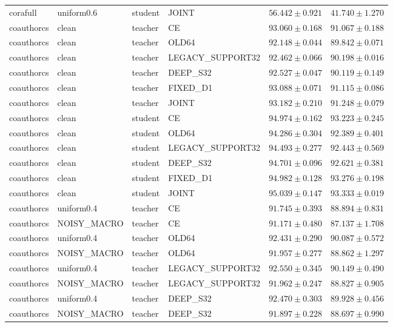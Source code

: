 \begin{longtable}{llllrr}
corafull & uniform0.6 & student & JOINT & $56.442 \pm 0.921$ & $41.740 \pm 1.270$ \\
coauthorcs & clean & teacher & CE & $93.060 \pm 0.168$ & $91.067 \pm 0.188$ \\
coauthorcs & clean & teacher & OLD64 & $92.148 \pm 0.044$ & $89.842 \pm 0.071$ \\
coauthorcs & clean & teacher & LEGACY\_SUPPORT32 & $92.462 \pm 0.066$ & $90.198 \pm 0.016$ \\
coauthorcs & clean & teacher & DEEP\_S32 & $92.527 \pm 0.047$ & $90.119 \pm 0.149$ \\
coauthorcs & clean & teacher & FIXED\_D1 & $93.088 \pm 0.071$ & $91.115 \pm 0.086$ \\
coauthorcs & clean & teacher & JOINT & $93.182 \pm 0.210$ & $91.248 \pm 0.079$ \\
coauthorcs & clean & student & CE & $94.974 \pm 0.162$ & $93.223 \pm 0.245$ \\
coauthorcs & clean & student & OLD64 & $94.286 \pm 0.304$ & $92.389 \pm 0.401$ \\
coauthorcs & clean & student & LEGACY\_SUPPORT32 & $94.493 \pm 0.277$ & $92.443 \pm 0.569$ \\
coauthorcs & clean & student & DEEP\_S32 & $94.701 \pm 0.096$ & $92.621 \pm 0.381$ \\
coauthorcs & clean & student & FIXED\_D1 & $94.982 \pm 0.128$ & $93.276 \pm 0.198$ \\
coauthorcs & clean & student & JOINT & $95.039 \pm 0.147$ & $93.333 \pm 0.019$ \\
coauthorcs & uniform0.4 & teacher & CE & $91.745 \pm 0.393$ & $88.894 \pm 0.831$ \\
coauthorcs & NOISY\_MACRO & teacher & CE & $91.171 \pm 0.480$ & $87.137 \pm 1.708$ \\
coauthorcs & uniform0.4 & teacher & OLD64 & $92.431 \pm 0.290$ & $90.087 \pm 0.572$ \\
coauthorcs & NOISY\_MACRO & teacher & OLD64 & $91.957 \pm 0.277$ & $88.862 \pm 1.297$ \\
coauthorcs & uniform0.4 & teacher & LEGACY\_SUPPORT32 & $92.550 \pm 0.345$ & $90.149 \pm 0.490$ \\
coauthorcs & NOISY\_MACRO & teacher & LEGACY\_SUPPORT32 & $91.962 \pm 0.247$ & $88.827 \pm 0.905$ \\
coauthorcs & uniform0.4 & teacher & DEEP\_S32 & $92.470 \pm 0.303$ & $89.928 \pm 0.456$ \\
coauthorcs & NOISY\_MACRO & teacher & DEEP\_S32 & $91.897 \pm 0.228$ & $88.697 \pm 0.990$ \\

\end{longtable}
